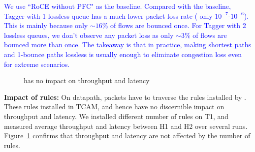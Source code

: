 \textcolor{blue}{We use ``RoCE without PFC" as the baseline. 
Compared with the baseline, Tagger with 1 lossless queue has a much lower packet loss rate ( only $10^{-7}$-$10^{-6}$). This is mainly because 
only $\sim 16\%$ of flows are bounced once. For Tagger with 2 lossless queues, we don't observe any packet loss as only $\sim 3\%$ of flows are bounced more than once.  The takeaway is that in practice, making shortest paths and 1-bounce paths lossless is usually enough to eliminate congestion loss even for extreme scenarios.}


\begin{figure}[t]
	\centering
	
	\vspace{-1em}
	\caption{\sysname{} has no impact on throughput and latency}
	\vspace{-2em}
	\label{fig:perf_penalty}
\end{figure}

\textbf{Impact of \sysname{} rules:} On datapath, packets have to traverse the rules installed by \sysname{}.  These
rules installed in TCAM, and hence have no discernible impact on throughput and
latency. We installed different number of \sysname{} rules on T1, and measured
average throughput and latency between H1 and H2 over several runs.
Figure~\ref{fig:perf_penalty} confirms that throughput and latency are not
affected by the number of rules.




